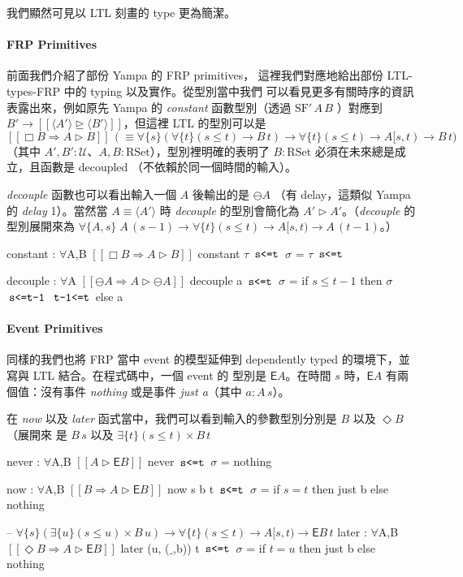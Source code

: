 \documentclass{article}
\newcommand{\llens}{[\![}
\newcommand{\rlens}{]\!]}
\newcommand{\TE}{\mathsf{E}}
\newcommand{\Wit}[1]{\,\text{\texttt{#1}}\,}
\newcommand{\U}{\mathcal{U}}
\newcommand{\Gt}{\tau}
\newcommand{\Gs}{\sigma}
\begin{document}
  我們顯然可見以 LTL 刻畫的 type 更為簡潔。

  \paragraph{FRP Primitives} 前面我們介紹了部份 Yampa 的 FRP primitives，
  這裡我們對應地給出部份 LTL-types-FRP 中的 typing 以及實作。從型別當中我們
  可以看見更多有關時序的資訊表露出來，例如原先 Yampa 的 \textit{constant}
  函數型別（透過 $\text{SF}'\,A\,B$ ）對應到$B'\to\llens \langle A'\rangle \unrhd \langle B'\rangle \rlens$，但這裡 LTL 的型別可以是 $\llens\Box B\Rightarrow A\rhd B\rlens\,(\equiv \forall\{s\}(\forall\{t\}(s\le t)\to B\,t)\to \forall\{t\}(s\le t)\to A[s,t)\to B\,t)$（其中 $A',B':\U$、$A,B:\text{RSet}$），型別裡明確的表明了 $B:\text{RSet}$ 必須在未來總是成立，且函數是
  decoupled （不依賴於同一個時間的輸入）。

  \textit{decouple} 函數也可以看出輸入一個 $A$ 後輸出的是 $\ominus A$
  （有 delay，這類似 Yampa 的 \textit{delay} 1）。當然當 $A\equiv\langle A'\rangle$ 時 \textit{decouple}
  的型別會簡化為 $A'\rhd A'$。（\textit{decouple} 的型別展開來為
  $\forall\{A,s\}\; A\,(s-1)\to \forall\{t\}(s\le t)\to A[s,t) \to A\,(t-1)$。）

  \begin{code}
  constant : $\forall${A,B} $\llens \Box B\Rightarrow A\rhd B\rlens$
  constant $\Gt$ $\Wit{s<=t}$ $\Gs$ = $\Gt$ $\Wit{s<=t}$

  decouple : $\forall${A} $\llens\ominus A\Rightarrow A\rhd \ominus A\rlens$
  decouple a $\Wit{s<=t}$ $\Gs$ = if $s\le t-1$ then $\Gs$ $\Wit{s<=t-1}$ $\Wit{t-1<=t}$ else a
  \end{code}
  \paragraph{Event Primitives} 同樣的我們也將 FRP 當中 event 的模型延伸到
  dependently typed 的環境下，並寫與 LTL 結合。在程式碼中，一個 event 的
  型別是 $\TE A$。在時間 $s$ 時，$\TE A$ 有兩個值：沒有事件 \textit{nothing}
  或是事件 \textit{just a}（其中 $a:A\,s$）。

  在 \textit{now} 以及 \textit{later} 函式當中，我們可以看到輸入的參數型別分別是 $B$ 以及 $\Diamond B$（展開來
  是 $B\,s$ 以及 $\exists \{t\} (s\le t)\times B\,t$

  \begin{code}
  never : $\forall${A,B} $\llens A\rhd \TE B\rlens$
  never $\Wit{s<=t}$ $\Gs$ = nothing

  now : $\forall${A,B} $\llens B\Rightarrow A\rhd\TE B\rlens$
  now {s} b {t} $\Wit{s<=t}$ $\Gs$ = if $s=t$ then just b else nothing

  -- $\forall\{s\} (\exists \{u\} (s\le u)\times B\,u) \to \forall\{t\}(s\le t)\to A[s,t)\to \TE B\, t$
  later : $\forall${A,B} $\llens \Diamond B\Rightarrow A\rhd\TE B\rlens$
  later ({u}, ($\_$,b)) {t} $\Wit{s<=t}$ $\Gs$ = if $t = u$ then just b else nothing
  \end{code}
\end{document}
